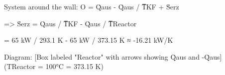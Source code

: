System around the wall:  
O = Q̇aus - Q̇aus / T̅KF + Ṡerz  

=> Ṡerz = Q̇aus / T̅KF - Q̇aus / T̅Reactor  

= 65 kW / 293.1 K - 65 kW / 373.15 K  
≈ -16.21 kW/K  

Diagram:  
[Box labeled "Reactor" with arrows showing Q̇aus and -Q̇aus]  
(TReactor = 100°C = 373.15 K)